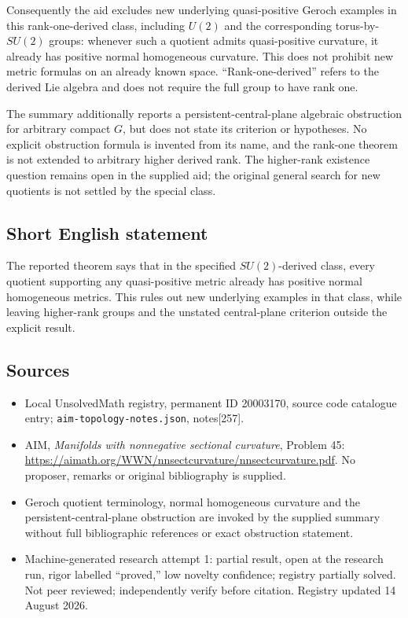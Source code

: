 \documentclass[11pt]{article}
\begin{document}
Consequently the aid excludes new underlying quasi-positive Geroch examples in this rank-one-derived class, including $U(2)$ and the corresponding torus-by-$SU(2)$ groups: whenever such a quotient admits quasi-positive curvature, it already has positive normal homogeneous curvature. This does not prohibit new metric formulas on an already known space. ``Rank-one-derived'' refers to the derived Lie algebra and does not require the full group to have rank one.

The summary additionally reports a persistent-central-plane algebraic obstruction for arbitrary compact $G$, but does not state its criterion or hypotheses. No explicit obstruction formula is invented from its name, and the rank-one theorem is not extended to arbitrary higher derived rank. The higher-rank existence question remains open in the supplied aid; the original general search for new quotients is not settled by the special class.
\subsection{Short English statement}
The reported theorem says that in the specified $SU(2)$-derived class, every quotient supporting any quasi-positive metric already has positive normal homogeneous metrics. This rules out new underlying examples in that class, while leaving higher-rank groups and the unstated central-plane criterion outside the explicit result.
\subsection{Sources}
\begin{itemize}
\item Local UnsolvedMath registry, permanent ID 20003170, source code catalogue entry; \texttt{aim-topology-notes.json}, notes[257].
\item AIM, \emph{Manifolds with nonnegative sectional curvature}, Problem 45: \url{https://aimath.org/WWN/nnsectcurvature/nnsectcurvature.pdf}. No proposer, remarks or original bibliography is supplied.
\item Geroch quotient terminology, normal homogeneous curvature and the persistent-central-plane obstruction are invoked by the supplied summary without full bibliographic references or exact obstruction statement.
\item Machine-generated research attempt 1: partial result, open at the research run, rigor labelled ``proved,'' low novelty confidence; registry partially solved. Not peer reviewed; independently verify before citation. Registry updated 14 August 2026.
\end{itemize}
\end{document}

